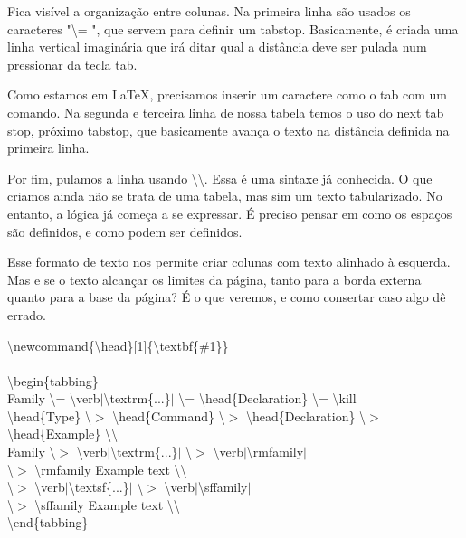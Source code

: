Fica visível a organização entre colunas.
Na primeira linha são usados os caracteres "\textbackslash = ", que servem para
definir um tabstop. Basicamente, é criada uma linha vertical imaginária que irá
ditar qual a distância deve ser pulada num pressionar da tecla tab.

Como estamos em \LaTeX, precisamos inserir um caractere como o tab com um
comando. Na segunda e terceira linha de nossa tabela temos o uso do next tab
stop, próximo tabstop, que basicamente avança o texto na distância definida na
primeira linha.

Por fim, pulamos a linha usando \textbackslash \textbackslash. Essa é uma
sintaxe já conhecida. O que criamos ainda não se trata de uma tabela, mas sim
um texto tabularizado. No entanto, a lógica já começa a se expressar. É preciso
pensar em como os espaços são definidos, e como podem ser definidos.

Esse formato de texto nos permite criar colunas com texto alinhado à esquerda.
Mas e se o texto alcançar os limites da página, tanto para a borda externa
quanto para a base da página? É o que veremos, e como consertar caso algo dê
errado.

\noindent\textbackslash newcommand\{\textbackslash head\}[1]\{\textbackslash textbf\{\#1\}\}\\
\\
\textbackslash begin\{tabbing\}\\
	Family \textbackslash = \textbackslash verb$|$\textbackslash textrm\{...\}$|$ \textbackslash = \textbackslash head\{Declaration\} \textbackslash = \textbackslash kill\\
	\textbackslash head\{Type\} \textbackslash $>$ \textbackslash head\{Command\} \textbackslash $>$ \textbackslash head\{Declaration\} \textbackslash $>$ \textbackslash head\{Example\} \textbackslash \textbackslash \\
	Family \textbackslash $>$ \textbackslash verb$|$\textbackslash textrm\{...\}$|$ \textbackslash $>$ \textbackslash verb$|$\textbackslash rmfamily$|$\\
	\textbackslash $>$ \textbackslash rmfamily Example text \textbackslash \textbackslash \\
	\textbackslash $>$ \textbackslash verb$|$\textbackslash textsf\{...\}$|$ \textbackslash $>$ \textbackslash verb$|$\textbackslash sffamily$|$\\
	\textbackslash $>$ \textbackslash sffamily Example text \textbackslash \textbackslash \\
\textbackslash end\{tabbing\}\\


